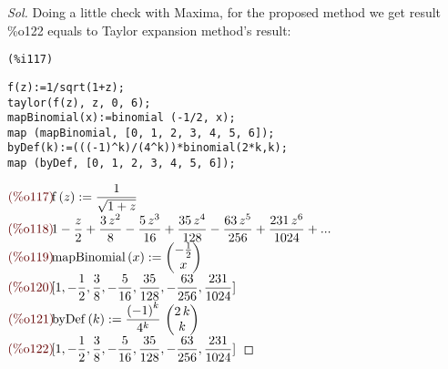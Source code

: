 \begin{proof}[Sol]
  Doing a little check with Maxima, for the proposed method we get
  result \%o122 %
  equals to Taylor
  expansion method's result:\\
\noindent
\begin{minipage}[t]{8ex}{\color{red}\bf
\begin{verbatim}
(%i117)
\end{verbatim}}
\end{minipage}
\begin{minipage}[t]{\textwidth}{\color{blue}
\begin{verbatim}
f(z):=1/sqrt(1+z);
taylor(f(z), z, 0, 6);
mapBinomial(x):=binomial (-1/2, x);
map (mapBinomial, [0, 1, 2, 3, 4, 5, 6]);
byDef(k):=(((-1)^k)/(4^k))*binomial(2*k,k);
map (byDef, [0, 1, 2, 3, 4, 5, 6]);
\end{verbatim}}
\end{minipage}
\begin{math}\displaystyle
\parbox{8ex}{\color{labelcolor}(\%o117) }
\mathrm{f}\left( z\right) :=\frac{1}{\sqrt{1+z}}
\end{math}\\
\begin{math}\displaystyle
\parbox{8ex}{\color{labelcolor}(\%o118) }
1-\frac{z}{2}+\frac{3\,{z}^{2}}{8}-\frac{5\,{z}^{3}}{16}+\frac{35\,{z}^{4}}{128}-\frac{63\,{z}^{5}}{256}+\frac{231\,{z}^{6}}{1024}+...
\end{math}\\
\begin{math}\displaystyle
\parbox{8ex}{\color{labelcolor}(\%o119) }
\mathrm{mapBinomial}\left( x\right) :=\begin{pmatrix}-\frac{1}{2}\cr x\end{pmatrix}
\end{math}\\
\begin{math}\displaystyle
\parbox{8ex}{\color{labelcolor}(\%o120) }
[1,-\frac{1}{2},\frac{3}{8},-\frac{5}{16},\frac{35}{128},-\frac{63}{256},\frac{231}{1024}]
\end{math}\\
\begin{math}\displaystyle
\parbox{8ex}{\color{labelcolor}(\%o121) }
\mathrm{byDef}\left( k\right) :=\frac{{\left( -1\right) }^{k}}{{4}^{k}}\,\begin{pmatrix}2\,k\cr k\end{pmatrix}
\end{math}\\
\begin{math}\displaystyle
\parbox{8ex}{\color{labelcolor}(\%o122) }
[1,-\frac{1}{2},\frac{3}{8},-\frac{5}{16},\frac{35}{128},-\frac{63}{256},\frac{231}{1024}]
\end{math}

\end{proof}
